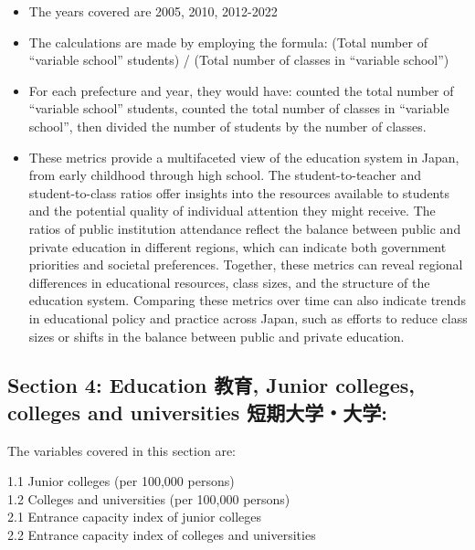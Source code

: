 \documentclass[
]{ltjarticle}
\begin{document}
\begin{itemize}
\item
  The years covered are 2005, 2010, 2012-2022
\item
  The calculations are made by employing the formula: (Total number of
  ``variable school'' students) / (Total number of classes in ``variable
  school'')
\item
  For each prefecture and year, they would have: counted the total
  number of ``variable school'' students, counted the total number of
  classes in ``variable school'', then divided the number of students by
  the number of classes.
\item
  These metrics provide a multifaceted view of the education system in
  Japan, from early childhood through high school. The
  student-to-teacher and student-to-class ratios offer insights into the
  resources available to students and the potential quality of
  individual attention they might receive. The ratios of public
  institution attendance reflect the balance between public and private
  education in different regions, which can indicate both government
  priorities and societal preferences. Together, these metrics can
  reveal regional differences in educational resources, class sizes, and
  the structure of the education system. Comparing these metrics over
  time can also indicate trends in educational policy and practice
  across Japan, such as efforts to reduce class sizes or shifts in the
  balance between public and private education.
\end{itemize}

\hypertarget{section-4-education-ux6559ux80b2-junior-colleges-colleges-and-universities-ux77edux671fux5927ux5b66ux5927ux5b66}{%
\subsection{Section 4: Education 教育, Junior colleges, colleges and
universities
短期大学・大学:}\label{section-4-education-ux6559ux80b2-junior-colleges-colleges-and-universities-ux77edux671fux5927ux5b66ux5927ux5b66}}

The variables covered in this section are:

1.1 Junior colleges (per 100,000 persons)\\
1.2 Colleges and universities (per 100,000 persons)\\

2.1 Entrance capacity index of junior colleges\\
2.2 Entrance capacity index of colleges and universities
\end{document}
